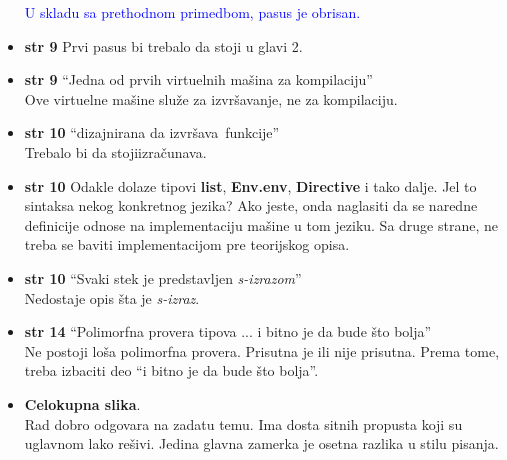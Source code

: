 \documentclass[a4paper]{report}
\newcommand{\odgovor}[1]{\textcolor{blue}{#1}}
\begin{document}
\begin{itemize}
\odgovor{U skladu sa prethodnom primedbom, pasus je obrisan.}
\item \textbf{str 9} Prvi pasus bi trebalo da stoji u glavi 2.
\item \textbf{str 9} ``Jedna od prvih virtuelnih mašina za kompilaciju'' \\ Ove virtuelne mašine služe za izvršavanje, ne za kompilaciju.
\item \textbf{str 10} ``dizajnirana da \color{blue}izvršava\color{black}~funkcije'' \\ Trebalo bi da stoji\color{blue}izračunava\color{black}.
\item \textbf{str 10} Odakle dolaze tipovi \textbf{list}, \textbf{Env.env}, \textbf{Directive} i tako dalje. Jel to sintaksa nekog konkretnog jezika? Ako jeste, onda naglasiti da se naredne definicije odnose na implementaciju mašine u tom jeziku. Sa druge strane, ne treba se baviti implementacijom pre teorijskog opisa.
\item \textbf{str 10} ``Svaki stek je predstavljen \textit{s-izrazom}'' \\ Nedostaje opis šta je \textit{s-izraz}.
\item \textbf{str 14} ``Polimorfna provera tipova ... i bitno je da bude što bolja'' \\ Ne postoji loša polimorfna provera. Prisutna je ili nije prisutna. Prema tome, treba izbaciti deo ``i bitno je da bude što bolja''.
\item \textbf{Celokupna slika}. \\Rad dobro odgovara na zadatu temu. Ima dosta sitnih propusta koji su uglavnom lako rešivi. Jedina glavna zamerka je osetna razlika u stilu pisanja.
\end{itemize}
\end{document}

